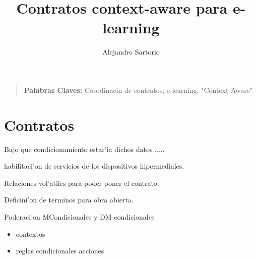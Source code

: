 \documentclass[11pt]{llncs}
\begin{document}
%
\frontmatter          %
%
%
\pagestyle{headings}  %
%


\title{Contratos context-aware para e-learning}

\author{Alejandro Sartorio}

 





\maketitle

\begin{abstract}
\end{abstract}

\begin{quote}

\small{\textbf{Palabras Claves:} Coordinacin de contratos, e-learning, "Context-Aware"}


\end{quote}



\section{Contratos}

Bajo que condicionamiento estar'ia dichos datos .....

habilitaci'on de servicios de los dispositivos hipermediales. 


Relaciones vol'atiles para poder poner el contrato.

Deficini'on de terminos para obra abierta.


Poderaci'on MCondicionales y DM condicionales

\begin{itemize}
\item contextos
\item reglas
\subitem condicionales
\subitem acciones
\end{itemize}
\end{document}

